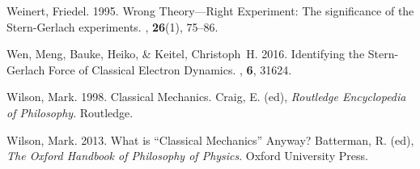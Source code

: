 \documentclass[onecolumn,secnumarabic,amsmath,amssymb,balancelastpage,nofootinbib]{article}
\begin{document}
\begin{thebibliography}{}
Weinert, Friedel. 1995.
\newblock Wrong Theory---Right Experiment: The significance of the
  Stern-Gerlach experiments.
, {\bf
  26}(1), 75--86.

Wen, Meng, Bauke, Heiko, \& Keitel, Christoph~H. 2016.
\newblock Identifying the Stern-Gerlach Force of Classical Electron Dynamics.
, {\bf 6}, 31624.

Wilson, Mark. 1998.
\newblock Classical Mechanics.
 Craig, E. (ed), {\em Routledge Encyclopedia of Philosophy}.
\newblock Routledge.

Wilson, Mark. 2013.
\newblock What is ``Classical Mechanics'' Anyway?
 Batterman, R. (ed), {\em The Oxford Handbook
  of Philosophy of Physics}.
\newblock Oxford University Press.

\end{thebibliography}
\end{document}
